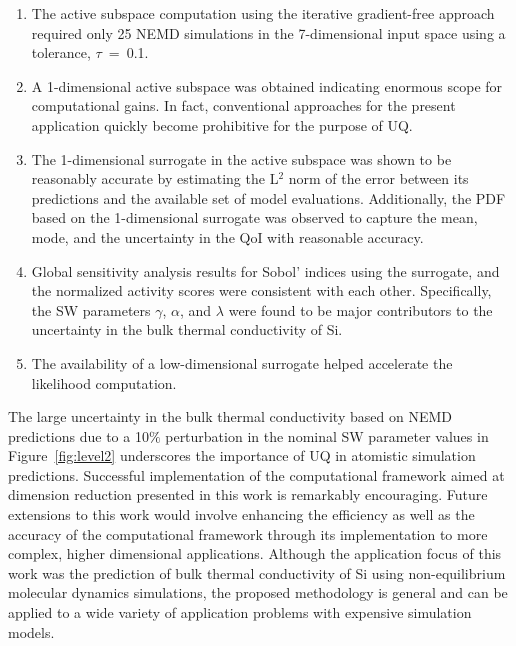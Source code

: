 \begin{enumerate}
\item The active subspace computation using the iterative gradient-free approach
required only 25 NEMD simulations in the 7-dimensional input space using a tolerance, 
$\tau$~=~0.1.

\item A 1-dimensional active subspace was obtained indicating enormous scope for
computational gains. In fact, conventional
approaches for the present application quickly become prohibitive for
the purpose of UQ. 

\item The 1-dimensional surrogate in the active subspace was shown to be reasonably accurate
by estimating the L$^2$ norm of the error between its predictions and the available set of
model evaluations. Additionally, the PDF based on the 1-dimensional surrogate was 
observed to capture the mean, mode, and the uncertainty in the QoI with reasonable accuracy.

\item Global sensitivity analysis results for Sobol' indices using the surrogate, and the
normalized activity scores were consistent with each other. Specifically, the SW parameters
$\gamma$, $\alpha$, and $\lambda$ were found to be major contributors to the
uncertainty in the bulk thermal conductivity of Si.

\item The availability of a low-dimensional surrogate helped accelerate the 
likelihood computation. 

\end{enumerate}
%
The large uncertainty in the bulk thermal conductivity based on NEMD predictions due to
a 10$\%$ perturbation in the nominal SW parameter values in Figure~\ref{fig:level2} underscores
the importance of UQ in atomistic simulation predictions. Successful implementation of the
computational framework aimed at dimension reduction presented in this work is remarkably
encouraging. Future extensions to this work would involve enhancing the efficiency as well
as the accuracy of the computational framework through its implementation to more complex,
higher dimensional applications. Although the application focus of this work was the prediction of
bulk thermal conductivity of Si using non-equilibrium molecular dynamics simulations, the proposed
methodology is general and can be applied to a wide variety of application problems with expensive 
simulation models. 
